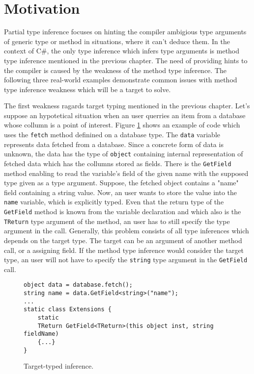 \section{Motivation}
Partial type inference focuses on hinting the compiler ambigious type arguments of generic type or method in situations, where it can't deduce them.
In the context of C\#, the only type inference which infers type arguments is method type inference mentioned in the previous chapter.
The need of providing hints to the compiler is caused by the weakness of the method type inference.
The following three real-world examples demonstrate common issues with method type inference weakness which will be a target to solve.
\par
{}
The first weakness ragards target typing mentioned in the previous chapter.  
Let's suppose an hypotetical situation when an user querries an item from a database whose collumn is a point of interest.
Figure \ref{img27:usecase1} shows an example of code which uses the \texttt{fetch} method definined on a database type.
The \texttt{data} variable represents data fetched from a database.
Since a concrete form of data is unknown, the data has the type of \texttt{object} containing internal representation of fetched data which has the collumns stored as fields.
There is the \texttt{GetField} method enabling to read the variable's field of the given name with the supposed type given as a type argument.
Suppose, the fetched object contains a "name" field containing a string value.
Now, an user wants to store the value into the \texttt{name} variable, which is explicitly typed.
Even that the return type of the \texttt{GetField} method is known from the variable declaration and which also is the \texttt{TReturn} type argument of the method, an user has to still specify the type argument in the call.
Generally, this problem consists of all type inferences which depends on the target type.
The target can be an argument of another method call, or a assigning field.
If the method type inference would consider the target type, an user will not have to specify the \texttt{string} type argument in the \texttt{GetField} call.
\begin{figure}[h]
\begin{lstlisting}[style=csharp]
object data = database.fetch();
string name = data.GetField<string>("name");
...
static class Extensions {
    static 
    TReturn GetField<TReturn>(this object inst, string fieldName) 
    {...}
}
\end{lstlisting}
\caption{Target-typed inference.}
\label{img27:usecase1}
\end{figure}
